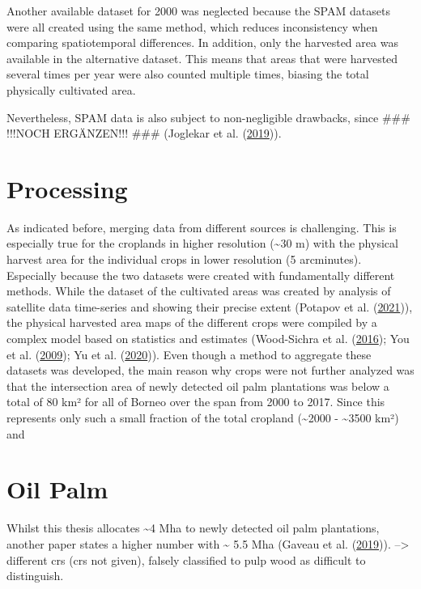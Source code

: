\documentclass[
  letterpaper,
  DIV=11,
  numbers=noendperiod]{scrreprt}
\begin{document}
Another available dataset for 2000 was neglected because the SPAM
datasets were all created using the same method, which reduces
inconsistency when comparing spatiotemporal differences. In addition,
only the harvested area was available in the alternative dataset. This
means that areas that were harvested several times per year were also
counted multiple times, biasing the total physically cultivated area.

Nevertheless, SPAM data is also subject to non-negligible drawbacks,
since \#\#\# !!!NOCH ERGÄNZEN!!! \#\#\# (Joglekar et al.
(\protect\hyperlink{ref-joglekarPixelatingCropProduction2019}{2019})).

\hypertarget{processing}{%
\section{Processing}\label{processing}}

As indicated before, merging data from different sources is challenging.
This is especially true for the croplands in higher resolution
(\textasciitilde30 m) with the physical harvest area for the individual
crops in lower resolution (5 arcminutes). Especially because the two
datasets were created with fundamentally different methods. While the
dataset of the cultivated areas was created by analysis of satellite
data time-series and showing their precise extent (Potapov et al.
(\protect\hyperlink{ref-potapovGlobalMapsCropland2021}{2021})), the
physical harvested area maps of the different crops were compiled by a
complex model based on statistics and estimates (Wood-Sichra et al.
(\protect\hyperlink{ref-wood-sichraSpatialProductionAllocation2016}{2016});
You et al.
(\protect\hyperlink{ref-youGeneratingPlausibleCrop2009}{2009}); Yu et
al. (\protect\hyperlink{ref-yuCultivatedPlanet20102020}{2020})). Even
though a method to aggregate these datasets was developed, the main
reason why crops were not further analyzed was that the intersection
area of newly detected oil palm plantations was below a total of 80 km²
for all of Borneo over the span from 2000 to 2017. Since this represents
only such a small fraction of the total cropland (\textasciitilde2000 -
\textasciitilde3500 km²) and

\hypertarget{oil-palm}{%
\section{Oil Palm}\label{oil-palm}}

Whilst this thesis allocates \textasciitilde4 Mha to newly detected oil
palm plantations, another paper states a higher number with
\textasciitilde{} 5.5 Mha (Gaveau et al.
(\protect\hyperlink{ref-gaveauRiseFallForest2019}{2019})).
--\textgreater{} different crs (crs not given), falsely classified to
pulp wood as difficult to distinguish.
\end{document}
